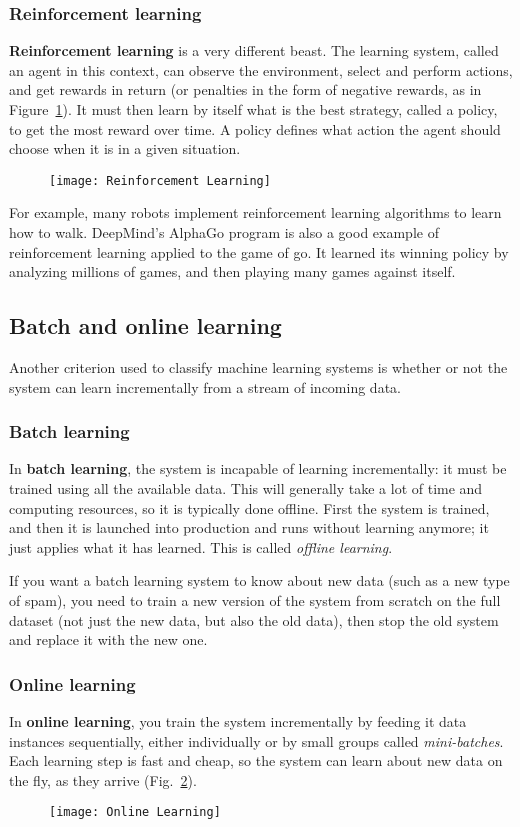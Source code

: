 \subsubsection{Reinforcement learning}
\textbf{Reinforcement learning} is a very different beast. The learning system, called an agent in this context, can observe the environment, select and perform actions, and get rewards in return (or penalties in the form of negative rewards, as in Figure~\ref{ReinforcementLearning}). It must then learn by itself what is the best strategy, called a policy, to get the most reward over time. A policy defines what action the agent should choose when it is in a given situation.
\begin{figure}[h!t]
\centering
\texttt{[image: Reinforcement Learning]}
\caption{}\label{ReinforcementLearning}
\end{figure}

For example, many robots implement reinforcement learning algorithms to learn how to walk. DeepMind's AlphaGo program is also a good example of reinforcement learning applied to the game of go. It learned its winning policy by analyzing millions of games, and then playing many games against itself.
\subsection{Batch and online learning}
Another criterion used to classify machine learning systems is whether or not the system can learn incrementally from a stream of incoming data.
\subsubsection{Batch learning}
In \textbf{batch learning}, the system is incapable of learning incrementally: it must be trained using all the available data. This will generally take a lot of time and computing resources, so it is typically done offline. First the system is trained, and then it is launched into production and runs without learning anymore; it just applies what it has learned. This is called \emph{offline learning}.

If you want a batch learning system to know about new data (such as a new type of spam), you need to train a new version of the system from scratch on the full dataset (not just the new data, but also the old data), then stop the old system and replace it with the new one.
\subsubsection{Online learning}
In \textbf{online learning}, you train the system incrementally by feeding it data instances sequentially, either individually or by small groups called \emph{mini-batches}. Each learning step is fast and cheap, so the system can learn about new data on the fly, as they arrive (Fig.~\ref{OnlineLearning}).
\begin{figure}[h!t]
\centering
\texttt{[image: Online Learning]}
\caption{}\label{OnlineLearning}
\end{figure}

